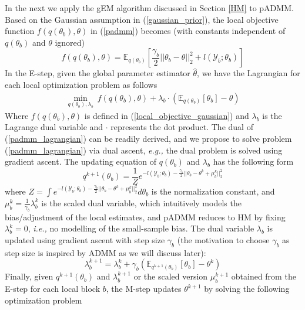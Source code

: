 \documentclass{article}
\newcommand{\ie}[0]{\emph{i.e., }}
\newcommand{\eg}[0]{\emph{e.g., }}
\newcommand{\1}[0]{\ensuremath{\boldsymbol{1}}\xspace}
\begin{document}
In the next we apply the gEM algorithm discussed in Section \ref{HM} to pADMM. Based on the Gaussian assumption in (\ref{gaussian_prior}), the local objective function $f(q(\theta_b), \theta)$ in (\ref{padmm}) becomes (with constants independent of $q(\theta_b)$ and $\theta$ ignored)
\begin{equation}\label{local_objective_gaussian}
f(q(\theta_b), \theta) = \mathbb{E}_{q(\theta_b)}\left[\frac{\gamma_b}{2}||\theta_b - \theta||_2^2 + l(\mathcal{Y}_b; \theta_b)\right]
\end{equation}
In the E-step, given the global parameter estimator $\hat\theta$, we have the Lagrangian for each local optimization problem as follows
\begin{equation}\label{padmm_lagrangian}
\begin{gathered}
\min_{q(\theta_b), \lambda_b} ~ f(q(\theta_b), \theta) + \lambda_b\cdot(\mathbb{E}_{q(\theta_b)}[\theta_b]- \theta)
\end{gathered}
\end{equation}
Where $f(q(\theta_b), \theta)$ is defined in (\ref{local_objective_gaussian}) and $\lambda_b$ is the Lagrange dual variable and $\cdot$ represents the dot product. The dual of (\ref{padmm_lagrangian}) can be readily derived, and we propose to solve problem (\ref{padmm_lagrangian}) via dual ascent, \eg the dual problem is solved using gradient ascent. The updating equation of $q(\theta_b)$ and $\lambda_b$ has the following form
\begin{equation}\label{padmm_primal_sol}
q^{k+1}(\theta_b) = \frac{1}{Z}e^{-l(\mathcal{Y}_b; \theta_b) -  \frac{\gamma_b}{2}||\theta_b-\theta^k + \mu^k_b||^2_2}
\end{equation}
where $Z = \int e^{-l(\mathcal{Y}_b; \theta_b) -  \frac{\gamma_b}{2}||\theta_b-\theta^k + \mu^k_b||^2_2} d\theta_b$ is the normalization constant, and $\mu^k_b = \frac{1}{\gamma_b}\lambda^k_b$ is the scaled dual variable, which intuitively models the bias/adjustment of the local estimates, and pADMM reduces to HM by fixing $\lambda^k_b = 0$, \ie no modelling of the small-sample bias. The dual variable $\lambda_b$ is updated using gradient ascent with step size $\gamma_b$ (the motivation to choose $\gamma_b$ as step size is inspired by ADMM as we will discuss later):
\begin{equation}\label{padmm_dual_sol}
\lambda^{k+1}_b = \lambda^k_b + \gamma_b(\mathbb{E}_{q^{k+1}(\theta_b)}[\theta_b] - \theta^k)
\end{equation}
Finally, given $q^{k+1}(\theta_b)$ and $\lambda^{k+1}_b$ or the scaled version $\mu^{k+1}_b$ obtained from the E-step for each local block $b$, the M-step updates $\theta^{k+1}$ by solving the following optimization problem
\end{document}
